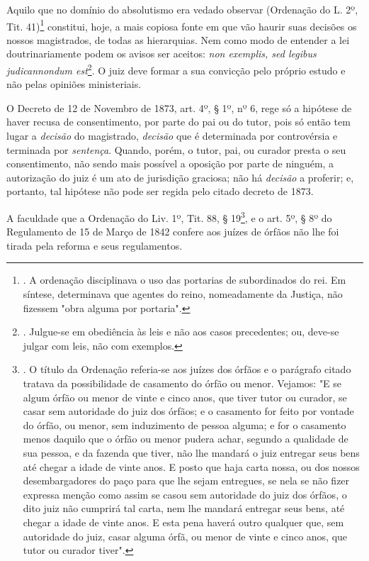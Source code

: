 Aquilo que no domínio do absolutismo era vedado observar (Ordenação do
L. 2º, Tit. 41)\footnote{. A ordenação disciplinava o uso das portarias
  de subordinados do rei. Em síntese, determinava que agentes do reino,
  nomeadamente da Justiça, não fizessem "obra alguma por portaria".}
constitui, hoje, a mais copiosa fonte em que vão haurir suas decisões os
nossos magistrados, de todas as hierarquias. Nem como modo de entender a
lei doutrinariamente podem os avisos ser aceitos: \emph{non exemplis,
sed legibus judicannondum est}\footnote{. Julgue-se em obediência às
  leis e não aos casos precedentes; ou, deve-se julgar com leis, não com
  exemplos.}. O juiz deve formar a sua convicção pelo próprio estudo e
não pelas opiniões ministeriais.

O Decreto de 12 de Novembro de 1873, art. 4º, § 1º, nº 6, rege só a
hipótese de haver recusa de consentimento, por parte do pai ou do tutor,
pois só então tem lugar a \emph{decisão} do magistrado, \emph{decisão}
que é determinada por controvérsia e terminada por \emph{sentença}.
Quando, porém, o tutor, pai, ou curador presta o seu consentimento, não
sendo mais possível a oposição por parte de ninguém, a autorização do
juiz é um ato de jurisdição graciosa; não há \emph{decisão} a proferir;
e, portanto, tal hipótese não pode ser regida pelo citado decreto de
1873.

A faculdade que a Ordenação do Liv. 1º, Tit. 88, § 19\footnote{. O
  título da Ordenação referia-se aos juízes dos órfãos e o parágrafo
  citado tratava da possibilidade de casamento do órfão ou menor.
  Vejamos: "E se algum órfão ou menor de vinte e cinco anos, que tiver
  tutor ou curador, se casar sem autoridade do juiz dos órfãos; e o
  casamento for feito por vontade do órfão, ou menor, sem induzimento de
  pessoa alguma; e for o casamento menos daquilo que o órfão ou menor
  pudera achar, segundo a qualidade de sua pessoa, e da fazenda que
  tiver, não lhe mandará o juiz entregar seus bens até chegar a idade de
  vinte anos. E posto que haja carta nossa, ou dos nossos
  desembargadores do paço para que lhe sejam entregues, se nela se não
  fizer expressa menção como assim se casou sem autoridade do juiz dos
  órfãos, o dito juiz não cumprirá tal carta, nem lhe mandará entregar
  seus bens, até chegar a idade de vinte anos. E esta pena haverá outro
  qualquer que, sem autoridade do juiz, casar alguma órfã, ou menor de
  vinte e cinco anos, que tutor ou curador tiver".}, e o art. 5º, § 8º
do Regulamento de 15 de Março de 1842 confere aos juízes de órfãos não
lhe foi tirada pela reforma e seus regulamentos.

